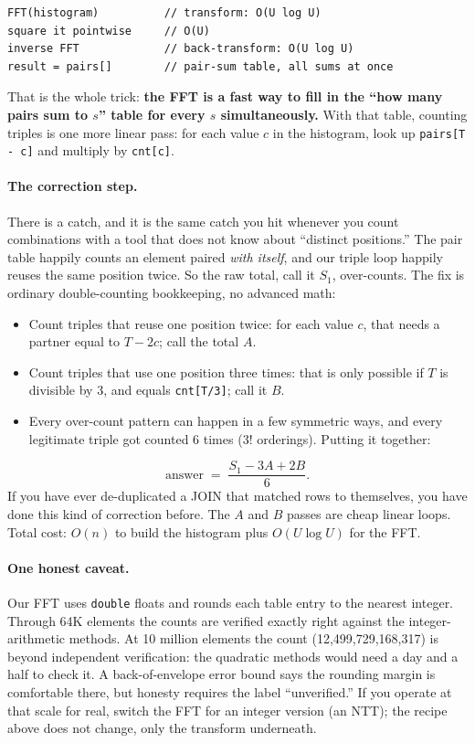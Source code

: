 \documentclass[11pt]{article}
\begin{document}
\begin{lstlisting}
FFT(histogram)          // transform: O(U log U)
square it pointwise     // O(U)
inverse FFT             // back-transform: O(U log U)
result = pairs[]        // pair-sum table, all sums at once
\end{lstlisting}

That is the whole trick: \textbf{the FFT is a fast way to fill in the ``how many
pairs sum to $s$'' table for every $s$ simultaneously.} With that table, counting
triples is one more linear pass: for each value $c$ in the histogram, look up
\texttt{pairs[T - c]} and multiply by \texttt{cnt[c]}.

\paragraph{The correction step.}
There is a catch, and it is the same catch you hit whenever you count
combinations with a tool that does not know about ``distinct positions.'' The
pair table happily counts an element paired \emph{with itself}, and our triple
loop happily reuses the same position twice. So the raw total, call it $S_1$,
over-counts. The fix is ordinary double-counting bookkeeping, no advanced math:

\begin{itemize}
\item Count triples that reuse one position twice: for each value $c$, that needs
      a partner equal to $T - 2c$; call the total $A$.
\item Count triples that use one position three times: that is only possible if
      $T$ is divisible by 3, and equals \texttt{cnt[T/3]}; call it $B$.
\item Every over-count pattern can happen in a few symmetric ways, and every
      legitimate triple got counted $6$ times ($3!$ orderings). Putting it
      together:
\end{itemize}
\[
\text{answer} \;=\; \frac{S_1 - 3A + 2B}{6}.
\]
If you have ever de-duplicated a JOIN that matched rows to themselves, you have
done this kind of correction before. The $A$ and $B$ passes are cheap linear
loops. Total cost: $O(n)$ to build the histogram plus $O(U \log U)$ for the FFT.

\paragraph{One honest caveat.}
Our FFT uses \texttt{double} floats and rounds each table entry to the nearest
integer. Through 64K elements the counts are verified exactly right against the
integer-arithmetic methods. At 10 million elements the count
(12{,}499{,}729{,}168{,}317) is beyond independent verification: the quadratic
methods would need a day and a half to check it. A back-of-envelope error bound
says the rounding margin is comfortable there, but honesty requires the label
``unverified.'' If you operate at that scale for real, switch the FFT for an
integer version (an NTT); the recipe above does not change, only the transform
underneath.
\end{document}
